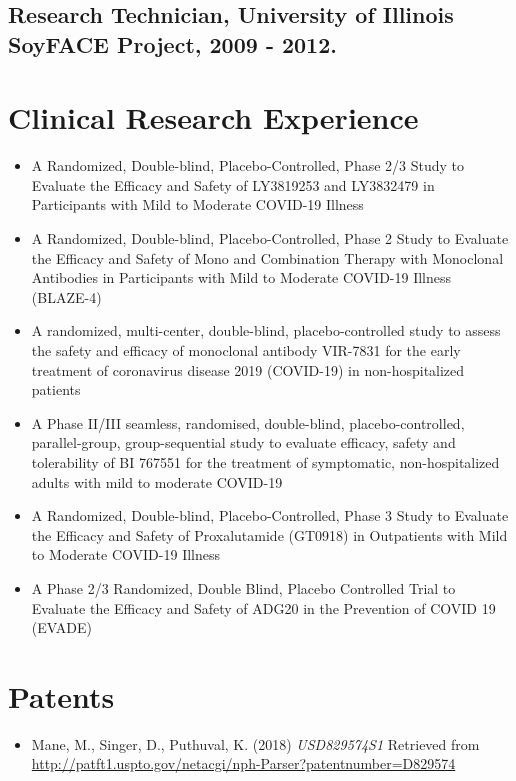\documentclass[letterpaper]{article}
\begin{document}
  \subsection*{Research Technician, University of Illinois SoyFACE Project, 2009 - 2012.}

\section*{Clinical Research Experience}

  \begin{itemize}

    \item A Randomized, Double-blind, Placebo-Controlled, Phase 2/3 Study to Evaluate the Efficacy and Safety of LY3819253 and LY3832479 in Participants with Mild to Moderate COVID-19 Illness
    \item A Randomized, Double-blind, Placebo-Controlled, Phase 2 Study to Evaluate the Efficacy and Safety of Mono and Combination Therapy with Monoclonal Antibodies in Participants with Mild to Moderate COVID-19 Illness (BLAZE-4)
    \item A randomized, multi-center, double-blind, placebo-controlled study to assess the safety and efficacy of monoclonal antibody VIR-7831 for the early treatment of coronavirus disease 2019 (COVID-19) in non-hospitalized patients    
    \item A Phase II/III seamless, randomised, double-blind, placebo-controlled, parallel-group, group-sequential study to evaluate efficacy, safety and tolerability of BI 767551 for the treatment of symptomatic, non-hospitalized adults with mild to moderate COVID-19
    \item A Randomized, Double-blind, Placebo-Controlled, Phase 3 Study to Evaluate the Efficacy and Safety of Proxalutamide (GT0918) in Outpatients with Mild to Moderate COVID-19 Illness
    \item A Phase 2/3 Randomized, Double Blind, Placebo Controlled Trial to Evaluate the Efficacy and Safety of ADG20 in the Prevention of COVID 19 (EVADE)

  \end{itemize}

\section*{Patents}

  \begin{itemize}
    \item Mane, M., Singer, D., Puthuval, K. (2018) {\it USD829574S1} Retrieved from \href{http://patft1.uspto.gov/netacgi/nph-Parser?patentnumber=D829574}{http://patft1.uspto.gov/netacgi/nph-Parser?patentnumber=D829574}
  \end{itemize}
\end{document}
